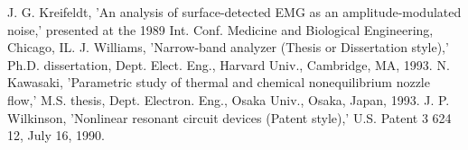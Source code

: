 \documentclass[letterpaper, 10 pt, conference]{ieeeconf}  %
\begin{document}
\begin{thebibliography}{99}
 J. G. Kreifeldt, 'An analysis of surface-detected EMG as an amplitude-modulated noise,' presented at the 1989 Int. Conf. Medicine and Biological Engineering, Chicago, IL.
 J. Williams, 'Narrow-band analyzer (Thesis or Dissertation style),' Ph.D. dissertation, Dept. Elect. Eng., Harvard Univ., Cambridge, MA, 1993. 
 N. Kawasaki, 'Parametric study of thermal and chemical nonequilibrium nozzle flow,' M.S. thesis, Dept. Electron. Eng., Osaka Univ., Osaka, Japan, 1993.
 J. P. Wilkinson, 'Nonlinear resonant circuit devices (Patent style),' U.S. Patent 3 624 12, July 16, 1990. 






\end{thebibliography}
\end{document}
